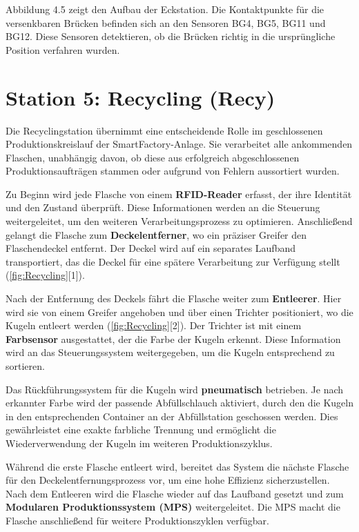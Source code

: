 Abbildung 4.5 zeigt den Aufbau der Eckstation. Die Kontaktpunkte für die versenkbaren Brücken befinden sich an den Sensoren BG4, BG5, BG11 und BG12. 
Diese Sensoren detektieren, ob die Brücken richtig in die ursprüngliche Position verfahren wurden.

\section{Station 5: Recycling (Recy)}\label{sec:Station 6: Recycling}

Die Recyclingstation übernimmt eine entscheidende Rolle im geschlossenen Produktionskreislauf der SmartFactory-Anlage. Sie verarbeitet alle 
ankommenden Flaschen, unabhängig davon, ob diese aus erfolgreich abgeschlossenen Produktionsaufträgen stammen oder aufgrund von Fehlern 
aussortiert wurden.

Zu Beginn wird jede Flasche von einem \textbf{RFID-Reader} erfasst, der ihre Identität und den Zustand überprüft. Diese Informationen werden an 
die Steuerung weitergeleitet, um den weiteren Verarbeitungsprozess zu optimieren. Anschließend gelangt die Flasche zum \textbf{Deckelentferner}, 
wo ein präziser Greifer den Flaschendeckel entfernt. Der Deckel wird auf ein separates Laufband transportiert, das die Deckel für eine spätere 
Verarbeitung zur Verfügung stellt (\ref{fig:Recycling}[1]).

Nach der Entfernung des Deckels fährt die Flasche weiter zum \textbf{Entleerer}. Hier wird sie von einem Greifer angehoben und über einen 
Trichter positioniert, wo die Kugeln entleert werden (\ref{fig:Recycling}[2]). Der Trichter ist mit einem 
\textbf{Farbsensor} ausgestattet, der die Farbe der Kugeln erkennt. Diese Information wird an das Steuerungssystem weitergegeben, um die 
Kugeln entsprechend zu sortieren.

Das Rückführungssystem für die Kugeln wird \textbf{pneumatisch} betrieben. Je nach erkannter Farbe wird der passende Abfüllschlauch 
aktiviert, durch den die Kugeln in den entsprechenden Container an der Abfüllstation geschossen werden. Dies gewährleistet eine exakte 
farbliche Trennung und ermöglicht die Wiederverwendung der Kugeln im weiteren Produktionszyklus.

Während die erste Flasche entleert wird, bereitet das System die nächste Flasche für den Deckelentfernungsprozess vor, um eine hohe Effizienz 
sicherzustellen. Nach dem Entleeren wird die Flasche wieder auf das Laufband gesetzt und zum \textbf{Modularen Produktionssystem (MPS)} 
weitergeleitet. Die MPS macht die Flasche anschließend für weitere Produktionszyklen verfügbar.

